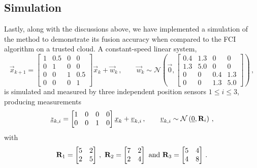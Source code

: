 % 
% 

\subsection{Simulation}\label{subsec:cloud_fusion:secfci_simulation}
Lastly, along with the discussions above, we have implemented a simulation of the method to demonstrate its fusion accuracy when compared to the FCI algorithm on a trusted cloud. A constant-speed linear system, 
\begin{equation}\label{eq:cloud_fusion:secfci_system_model}
    \vec{x}_{k+1} = 
    \begin{bmatrix}
        1 & 0.5 & 0 & 0\\
        0 & 1 & 0 & 0\\
        0 & 0 & 1 & 0.5\\
        0 & 0 & 0 & 1
    \end{bmatrix}\vec{x}_k + \vec{w}_k\,,\qquad \vec{w}_k\sim\mathcal{N}\left(\vec{0},
    \begin{bmatrix}
        0.4 & 1.3 & 0 & 0\\
        1.3 & 5.0 & 0 & 0\\
        0 & 0 & 0.4 & 1.3\\
        0 & 0 & 1.3 & 5.0
    \end{bmatrix}
    \right)\,,
\end{equation}
is simulated and measured by three independent position sensors $1\leq i\leq 3$, producing measurements 
\begin{equation}\label{eq:cloud_fusion:secfci_measurement_model}
    {\underline{z}}_{k,i} = 
    \begin{bmatrix}
        1 & 0 & 0 & 0\\
        0 & 0 & 1 & 0
     \end{bmatrix}{\underline{x}}_k + {\underline{v}}_{k,i}\,,\qquad {\underline{v}}_{k,i}\sim\mathcal{N}\left({\underline{0}},{{\mathbf{R}}}_i\right)\,,
\end{equation}
with
\begin{equation}
    \mat{R}_1=
    \begin{bmatrix}
        5 & 2\\
        2 & 5
    \end{bmatrix}\,,\ 
    \mat{R}_2=
    \begin{bmatrix}
        7 & 2\\
        2 & 4
    \end{bmatrix}\text{ and }
    \mat{R}_3=
    \begin{bmatrix}
        5 & 4\\
        4 & 8
    \end{bmatrix}\,.
\end{equation}
